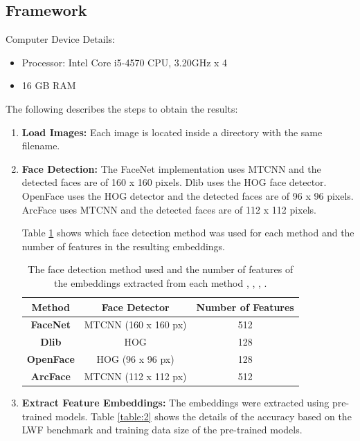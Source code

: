 \documentclass[12pt,english]{article}
\begin{document}
\subsection{Framework}
\quad
Computer Device Details:
\begin{itemize}
\item Processor: Intel Core i5-4570 CPU, 3.20GHz x 4
\item 16 GB RAM
\end{itemize}

The following describes the steps to obtain the results:

\begin{enumerate}
\item \textbf{Load Images: } Each image is located inside a directory with the same filename.
\item \textbf{Face Detection: } The FaceNet implementation uses MTCNN and the detected faces are of 160 x 160 pixels. Dlib uses the HOG face detector. OpenFace uses the HOG detector and the detected faces are of 96 x 96 pixels. ArcFace uses MTCNN and the detected faces are of 112 x 112 pixels.

Table \ref{table:1} shows which face detection method was used for each method and the number of features in the resulting embeddings.

\begin{table}[H]
\centering
\begin{tabular}{||c c c||} 
 \hline
  Method & Face Detector & Number of Features\\ [0.5ex]
 \hline\hline
 \textbf{FaceNet} & MTCNN (160 x 160 px) & 512\\ 
 \hline
 \textbf{Dlib} & HOG & 128\\
 \hline
 \textbf{OpenFace} & HOG (96 x 96 px) & 128\\
 \hline
 \textbf{ArcFace} & MTCNN (112 x 112 px) & 512\\
 \hline
\end{tabular}
\caption{The face detection method used and the number of features of the embeddings extracted from each method \cite{sandberg}, \cite{geitgey}, \cite{amos2016}, \cite{deng2019}.}
\label{table:1}
\end{table}

\item \textbf{Extract Feature Embeddings: } The embeddings were extracted using pre-trained models. Table \ref{table:2} shows the details of the accuracy based on the LWF benchmark and training data size of the pre-trained models.


\end{enumerate}
\end{document}
